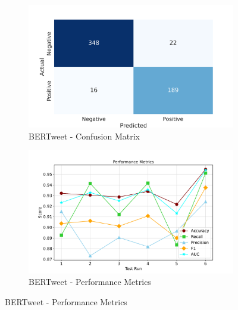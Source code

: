 \begin{figure}[!ht]
    \centering
    \captionsetup{font=small}
    \begin{subfigure}{0.45\linewidth}
        \includegraphics[width=\linewidth]{figures/confusion_bertweet.png}
        \caption{BERTweet - Confusion Matrix}
    \end{subfigure}
    \hfil
    \begin{subfigure}{0.45\linewidth}
        \includegraphics[width=\linewidth]{figures/metrics_line_bertweet.pdf}
        \caption{BERTweet - Performance Metrics}
    \end{subfigure}


\end{figure}
